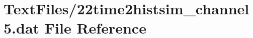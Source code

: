 \hypertarget{22time2histsim__channel5_8dat}{}\section{Text\+Files/22time2histsim\+\_\+channel5.dat File Reference}
\label{22time2histsim__channel5_8dat}
